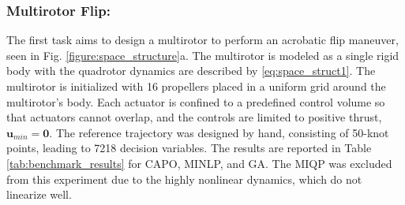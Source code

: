 \subsubsection{Multirotor Flip:}
The first task aims to design a multirotor to perform an acrobatic flip maneuver, seen in Fig. \ref{figure:space_structure}a. The multirotor is modeled as a single rigid body with the quadrotor dynamics are described by \eqref{eq:space_struct1}. The multirotor is initialized with 16 propellers placed in a uniform grid around the multirotor's body. Each actuator is confined to a predefined control volume so that actuators cannot overlap, and the controls are limited to positive thrust, $\textbf{u}_{min}=\textbf{0}$. The reference trajectory was designed by hand, consisting of 50-knot points, leading to 7218 decision variables. The results are reported in Table \ref{tab:benchmark_results} for CAPO, MINLP, and GA. The MIQP was excluded from this experiment due to the highly nonlinear dynamics, which do not linearize well. 

